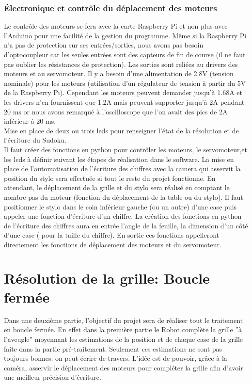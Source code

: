 \documentclass[11pt]{article}
\begin{document}
\section{\'{E}lectronique et contrôle du déplacement des moteurs}
Le contrôle des moteurs se fera avec la carte Raspberry Pi et non plus avec l'Arduino pour une facilité de la gestion du programme.
Même si la Raspberry Pi n'a pas de protection sur ses entrées/sorties, nous avons pas besoin d’optocoupleur car les seules entrées sont des capteurs de fin de course (il ne faut pas oublier les résistances de protection). Les sorties sont reliées au drivers des moteurs et au servomoteur.
Il y a besoin d'une alimentation de 2.8V (tension nominale) pour les moteurs (utilisation d'un régulateur de tension à partir du 5V de la Raspberry Pi).
Cependant les moteurs peuvent demander jusqu'à 1.68A et les drivers n'en fournissent que 1.2A mais peuvent supporter jusqu'à 2A pendant 20 ms or nous avons remarqué à l'oscilloscope que l'on avait des pics de 2A inférieur à 20 ms.\\

Mise en place de deux ou trois leds pour renseigner l'état de la résolution et de l'écriture du Sudoku.\\

Il faut créer des fonctions en python pour contrôler les moteurs, le servomoteur,et les leds à définir suivant les étapes de réalisation dans le software. La mise en place de l'automatisation de l'écriture des chiffres avec la camera qui asservit la position du stylo sera effectuée si tout le reste du projet fonctionne. En attendant, le déplacement de la grille et du stylo sera réalisé en comptant le nombre pas du moteur (fonction du déplacement de la table ou du stylo). Il faut positionner le stylo dans le coin inférieur gauche (ou un autre) d'une case puis appeler une fonction d'écriture d'un chiffre. La création des fonctions en python de l'écriture des chiffres aura en entrée l'angle de la feuille, la dimension d'un côté d'une case ( pour la taille du chiffre). En sortie ces fonctions appelleront directement les fonctions de déplacement des moteurs et du servomoteur.

\part{Résolution de la grille: Boucle fermée}

Dans une deuxième partie, l'objectif du projet sera de réaliser tout le traitement en boucle fermée. En effet dans la première partie le Robot complète la grille ''à l'aveugle'' moyennant les estimations de la position et de chaque case de la grille faite dans la partie pré-traitement. Seulement ces estimations ne sont pas toujours bonnes: on peut écrire de travers. L'idée est de pouvoir, grâce à la caméra, asservir le déplacement des moteurs pour compléter la grille afin d'avoir une meilleur précision d'écriture.\\
\end{document}
